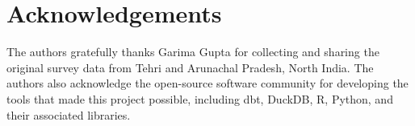 \documentclass{article}
\begin{document}
\section{Acknowledgements}

The authors gratefully thanks Garima Gupta for collecting and sharing the original survey data from Tehri and Arunachal Pradesh, North India. The authors also acknowledge the open-source software community for developing the tools that made this project possible, including dbt, DuckDB, R, Python, and their associated libraries.

\appendix









\end{document}
